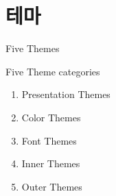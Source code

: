 \documentclass[10pt,blue,xcolor=pdftex,dvipsnames,table,handout]{beamer}
\begin{document}
		\section{테마}

		\begin{frame}[plain]
		\centering
		\end{frame}



		\begin{frame}[t]{Five Themes}

			\begin{block} {Five Theme categories}
			\begin{enumerate}
			\item Presentation Themes
			\item Color Themes
			\item Font Themes
			\item Inner Themes
			\item Outer Themes
			\end{enumerate}
			\end{block}

		\end{frame}
\end{document}
